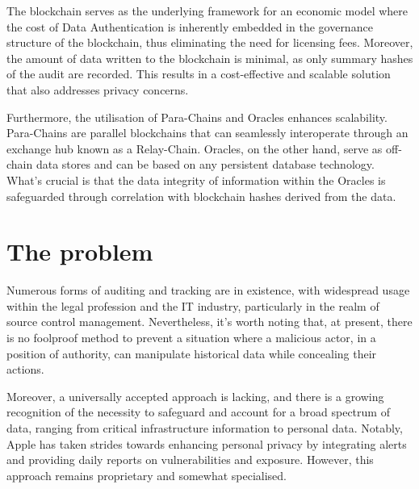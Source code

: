 \documentclass{tufte-handout}
\begin{document}

The blockchain serves as the underlying framework for an economic model where the cost of Data Authentication is inherently embedded in the governance structure of the blockchain, thus eliminating the
need for licensing fees. Moreover, the amount of data written to the blockchain is minimal, as only summary hashes of the audit are recorded. This results in a cost-effective and scalable solution that
also addresses privacy concerns.


Furthermore, the utilisation of Para-Chains and Oracles enhances scalability. Para-Chains are parallel blockchains that can seamlessly interoperate through an exchange hub known as a Relay-Chain. Oracles,
on the other hand, serve as off-chain data stores and can be based on any persistent database technology. What's crucial is that the data integrity of information within the Oracles is safeguarded through
correlation with blockchain hashes derived from the data.

\section{The problem}\label{sec:page-layout}
Numerous forms of auditing and tracking are in existence, with widespread usage within the legal profession and the IT industry, particularly in the realm of source control management. Nevertheless,
it's worth noting that, at present, there is no foolproof method to prevent a situation where a malicious actor, in a position of authority, can manipulate historical data while concealing their actions.

Moreover, a universally accepted approach is lacking, and there is a growing recognition of the necessity to safeguard and account for a broad spectrum of data, ranging from critical infrastructure
information to personal data. Notably, Apple has taken strides towards enhancing personal privacy by integrating alerts and providing daily reports on vulnerabilities and exposure. However, this
approach remains proprietary and somewhat specialised.
\end{document}
